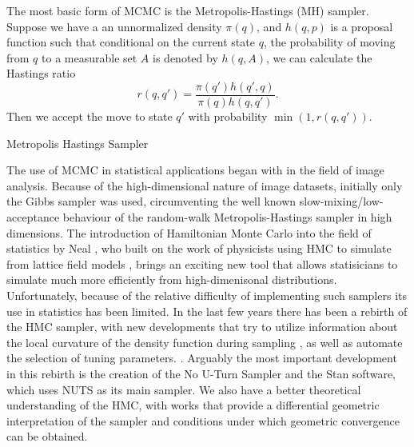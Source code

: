 \documentclass[12pt]{report}
\begin{document}
The most basic form of MCMC is the Metropolis-Hastings (MH) sampler. Suppose we have a an unnormalized density $\pi(q)$, and $h(q,p)$ is a proposal function such that conditional on the current state $q$, the probability of moving from $q$ to a measurable set $A$ is denoted by $h(q,A)$, we can calculate the Hastings ratio
\[ r(q,q') = \frac{\pi(q')h(q',q)}{\pi(q)h(q,q')}. \]
Then we accept the move to state $q'$ with probability $ \min (1, r(q,q')) $.

\begin{algorithm}
\caption{Metropolis Hastings Sampler}


 
 
\end{algorithm}


The use of MCMC in statistical applications began with \cite{geman1984stochastic,besag1986statistical} in the field of image analysis. Because of the high-dimensional nature of image datasets, initially only the Gibbs sampler was used, circumventing the well known slow-mixing/low-acceptance behaviour of the random-walk Metropolis-Hastings sampler in high dimensions. The introduction of Hamiltonian Monte Carlo into the field of statistics by Neal \cite{neal2011mcmc,neal2012bayesian}, who built on the work of physicists using HMC to simulate from lattice field models \cite{duane1987hybrid}, brings an exciting new tool that allows statisicians to simulate much more efficiently from high-dimenisonal distributions. Unfortunately, because of the relative difficulty of implementing such samplers its use in statistics has been limited. In the last few years there has been a rebirth of the HMC sampler, with new developments that try to utilize information about the local curvature of the density function during sampling \cite{girolami2011riemann,betancourt2013general}, as well as  automate the selection of tuning parameters.  \cite{hoffman2014no,betancourt2016identifying}. 
Arguably the most important development in this rebirth is the creation of the No U-Turn Sampler and the Stan software, which uses NUTS as its main sampler. We also have a better theoretical understanding of the HMC, with works \cite{betancourt2014geometric,livingstone2016geometric}
that provide a differential geometric interpretation of the sampler and conditions under which geometric convergence can be obtained.
\end{document}
